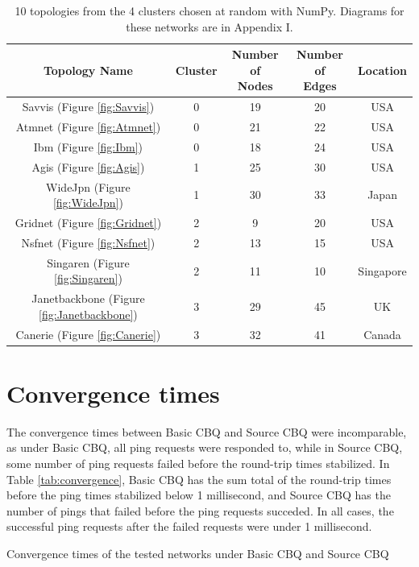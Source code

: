 \begin{table}[htbp]
    \centering
    \begin{tabular}{ccccc}
    \toprule
        Topology Name & Cluster & \makecell{Number of\\ Nodes} & \makecell{Number of \\Edges} & Location \\
    \midrule
        Savvis (Figure \ref{fig:Savvis}) & 0 & 19 & 20 & USA \\
        Atmnet (Figure \ref{fig:Atmnet})& 0 & 21 & 22 & USA \\
        Ibm (Figure \ref{fig:Ibm})& 0 & 18 & 24 & USA \\
        Agis (Figure \ref{fig:Agis})& 1 & 25 & 30 & USA \\
        WideJpn (Figure \ref{fig:WideJpn})& 1 & 30 & 33 & Japan \\
        Gridnet (Figure \ref{fig:Gridnet})& 2 & 9 & 20 & USA \\
        Nsfnet (Figure \ref{fig:Nsfnet})& 2 & 13 & 15 & USA \\
        Singaren (Figure \ref{fig:Singaren})& 2 & 11 & 10 & Singapore \\
        Janetbackbone (Figure \ref{fig:Janetbackbone})& 3 & 29 & 45 & UK \\
        Canerie (Figure \ref{fig:Canerie})& 3 & 32 & 41 & Canada \\
    \bottomrule
    \end{tabular}
    \caption{10 topologies from the 4 clusters chosen at random with NumPy. Diagrams for these networks are in Appendix I.}
    \label{tab:choices}
\end{table}


\section{Convergence times}
The convergence times between Basic CBQ and Source CBQ were incomparable, as under Basic CBQ, all ping requests were responded to, while in Source CBQ, some number of ping requests failed before the round-trip times stabilized. In Table \ref{tab:convergence}, Basic CBQ has the sum total of the round-trip times before the ping times stabilized below 1 millisecond, and Source CBQ has the number of pings that failed before the ping requests succeded. In all cases, the successful ping requests after the failed requests were under 1 millisecond.

\begin{table}[htbp]
\caption{Convergence times of the tested networks under Basic CBQ and Source CBQ}
\centering

\label{tab:convergence}
\end{table}

